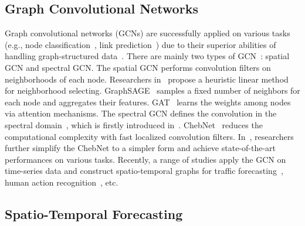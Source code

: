\documentclass[10pt,journal,compsoc]{IEEEtran}
\begin{document}
\subsection{Graph Convolutional Networks} 

Graph convolutional networks (GCNs) are successfully applied on various tasks (e.g., node classification~\cite{Kipf-and-Welling:ICLR2017}, link prediction~\cite{Zhang-et-al:NIPS2018}) due to their superior abilities of handling graph-structured data~\cite{Wu-et-al:TNNLS2021}. There are mainly two types of GCN~\cite{Bronstein-et-al:SPM2017}: spatial GCN and spectral GCN. The spatial GCN performs convolution filters on neighborhoods of each node. Researchers in~\cite{Niepert-et-al:ICML2016} propose a heuristic linear method for neighborhood selecting. GraphSAGE~\cite{Hamilton-et-al:NIPS2017} samples a fixed number of neighbors for each node and aggregates their features. GAT~\cite{Velickovic-et-al:ICLR2018} learns the weights among nodes via attention mechanisms. The spectral GCN defines the convolution in the spectral domain~\cite{Li-et-al:AAAI2020}, which is firstly introduced in~\cite{Bruna-et-al:ICLR2014}. ChebNet~\cite{Defferrard-et-al:NIPS2016} reduces the computational complexity with fast localized convolution filters. In~\cite{Kipf-and-Welling:ICLR2017}, researchers further simplify the ChebNet to a simpler form and achieve state-of-the-art performances on various tasks. Recently, a range of studies apply the GCN on time-series data and construct spatio-temporal graphs for traffic forecasting~\cite{Li-et-al:ICLR2018,Zhang-et-al:TITS2021}, human action recognition~\cite{Yan-et-al:AAAI2018,Shi-et-al:CVPR2019}, etc. 

\subsection{Spatio-Temporal Forecasting} 
\end{document}
